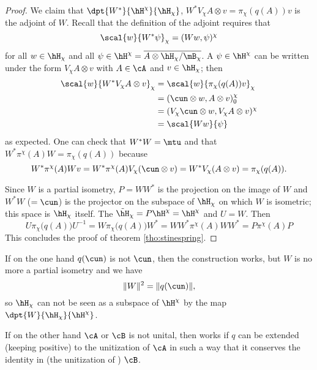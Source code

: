 \begin{proof}
We claim that $\dpt{ W^* }{ \hH^{\chi} }{ \hH_{\chi} }$, $W^*V_{\chi} A\otimes v=\pi_{\chi}(q(A))v$ is the adjoint of $W$. Recall that the definition of the adjoint requires that 
\[ 
  \scal{ w }{ W^*\psi }_{\chi}=( Ww , \psi )^{\chi}
\]
for all $w\in\hH_{\chi}$ and all $\psi\in\hH^{\chi}=\overline{ A\otimes\hH_{\chi}/\mB_{\chi} }$. A $\psi\in\hH^{\chi}$ can be written under the form $V_{\chi}A\otimes v$ with $A\in\cA$ and $v\in\hH_{\chi}$; then
\begin{equation}
\begin{split}
\scal{ w }{ W^*V_{\chi}A\otimes v }_{\chi}&=\scal{ w }{ \pi_{\chi}(q(A))v }_{\chi}\\
        &=( \cun\otimes w , A\otimes v )_0^{\chi}\\
        &=( V_{\chi}\cun\otimes w , V_{\chi}A\otimes v )^{\chi}\\
        &=\scal{ Ww }{ \psi }
\end{split}
\end{equation}
as expected. One can check that $W^*W=\mtu$ and that $W^*\pi^{\chi}(A)W=\pi_{\chi}(q(A))$ because
\begin{equation}
  W^*\pi^{\chi}(A)Wv=W^*\pi^{\chi}(A)V_{\chi}(\cun\otimes v)
        =W^*V_{\chi}(A\otimes v)
        =\pi_{\chi}(q(A)).
\end{equation}


Since $W$ is a partial isometry, $P=WW^*$ is the projection on the image of $W$ and $W^*W$ ($=\cun$) is the projector on the subspace of $\hH_{\chi}$ on which $W$ is isometric; this space is $\hH_{\chi}$ itself. The $\tilde\hH_{\chi}=P\hH^{\chi}=\hH^{\chi}$ and $U=W$. Then
\begin{equation}
  U\pi_{\chi}\big( q(A) \big)U^{-1}=W\pi_{\chi}\big( q(A) \big)W^*
        =WW^*\pi^{\chi}(A)WW^*
        =P\pi^{\chi}(A)P
\end{equation}
This concludes the proof of theorem \ref{tho:stinespring}.

\end{proof}


\begin{remark}
If on the one hand $q(\cun)$ is not $\cun$, then the construction works, but $W$ is no more a partial isometry and we have
\[ 
  \| W \|^2=\| q(\cun) \|,
\]
so $\hH_{\chi}$ can not be seen as a subspace of $\hH^{\chi}$ by the map $\dpt{W}{ \hH_{\chi} }{ \hH^{\chi} }$.

If on the other hand $\cA$ or $\cB$ is not unital, then works if $q$ can be extended (keeping positive) to the unitization of $\cA$ in such a way that it conserves the identity in (the unitization of ) $\cB$.
\end{remark}

